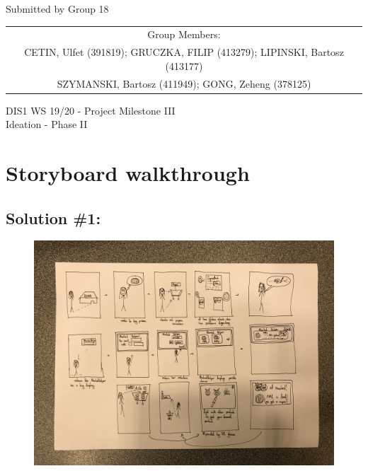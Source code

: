 \documentclass[a4paper,10pt,oneside]{scrreprt}
\begin{document}
\begin{center}
	Submitted by Group 18

	\bigskip

	\begin{tabular}{c}
	Group Members: \\
	CETIN, Ulfet (391819); GRUCZKA, FILIP (413279);	LIPINSKI, Bartosz (413177) \\
	SZYMANSKI, Bartosz (411949); GONG, Zeheng (378125)\\
	\end{tabular}

	\bigskip

	DIS1 WS 19/20 - Project Milestone III\\
	Ideation - Phase II\\

\end{center}
\vspace{-1cm}

\clearpage

\begingroup
\let\clearpage\relax
	\chapter{Storyboard walkthrough}
\endgroup


\section{Solution \#1:}

\begin{figure}[H]
	\centering
	\includegraphics[scale=0.16, clip, trim={40em 28em 40em 33em}]{images/s1.jpg}
\end{figure}
\end{document}
